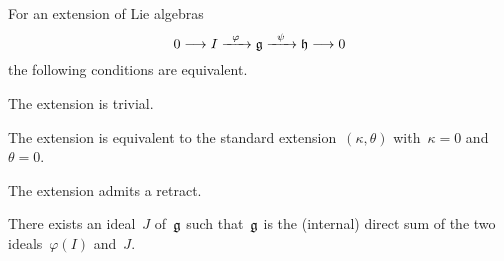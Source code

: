 \begin{proposition}
  For an extension of Lie algebras
  \[
    0
    \to
    I
    \xto{\varphi}
    \glie
    \xto{\psi}
    \hlie
    \to
    0
  \]
  the following conditions are equivalent.
  \begin{equivalenceslist*}
    \item
      \label{extension is trivial}
      The extension is trivial.
    \item
      \label{extension is equivalent to 0 0}
      The extension is equivalent to the standard extension~$(\kappa, \theta)$ with~$\kappa = 0$ and~$\theta = 0$.
    \item
      \label{extension admits a retract}
      The extension admits a retract.
    \item
      \label{image of I admits a direct complement}
      There exists an ideal~$J$ of~$\mathfrak{g}$ such that~$\mathfrak{g}$ is the (internal) direct sum of the two ideals~$\varphi(I)$ and~$J$.
  \end{equivalenceslist*}
\end{proposition}

